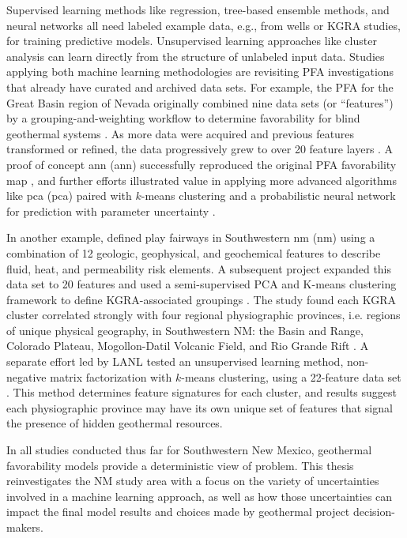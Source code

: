Supervised learning methods like regression, tree-based ensemble methods, and neural networks all need labeled example data, e.g., from wells or KGRA studies, for training predictive models. Unsupervised learning approaches like cluster analysis can learn directly from the structure of unlabeled input data. Studies applying both machine learning methodologies are revisiting PFA investigations that already have curated and archived data sets. For example, the PFA for the Great Basin region of Nevada originally combined nine data sets (or ``features'') by a grouping-and-weighting workflow to determine favorability for blind geothermal systems \citep{faulds_progress_2017}. As more data were acquired and previous features transformed or refined, the data progressively grew to over 20 feature layers \citep{brown_machine_2020, faulds_discovering_2019}. A proof of concept \acrlong{ann} (\acrshort{ann}) successfully reproduced the original PFA favorability map \citep{brown_machine_2020}, and further efforts illustrated value in applying more advanced algorithms like \acrlong{pca} (\acrshort{pca}) paired with $k$-means clustering \citep{smith_characterizing_2021} and a probabilistic neural network for prediction with parameter uncertainty \citep{brown_personal_2021}.

In another example, \citet{bielicki_hydrogeolgic_2015} defined play fairways in Southwestern \acrlong{nm} (\acrshort{nm}) using a combination of 12 geologic, geophysical, and geochemical features to describe fluid, heat, and permeability risk elements. A subsequent project expanded this data set to 20 features and used a semi-supervised PCA and K-means clustering framework to define KGRA-associated groupings \citep{pepin_new_2019}. The study found each KGRA cluster correlated strongly with four regional physiographic provinces, i.e. regions of unique physical geography, in Southwestern NM: the Basin and Range, Colorado Plateau, Mogollon-Datil Volcanic Field, and Rio Grande Rift \citep{pepin_new_2019}. A separate effort led by LANL tested an unsupervised learning method, non-negative matrix factorization with $k$-means clustering, using a 22-feature data set \citep{vesselinov_discovering_2020}. This method determines feature signatures for each cluster, and results suggest each physiographic province may have its own unique set of features that signal the presence of hidden geothermal resources. 

In all studies conducted thus far for Southwestern New Mexico, geothermal favorability models provide a deterministic view of problem. This thesis reinvestigates the NM study area with a focus on the variety of uncertainties involved in a machine learning approach, as well as how those uncertainties can impact the final model results and choices made by geothermal project decision-makers.

